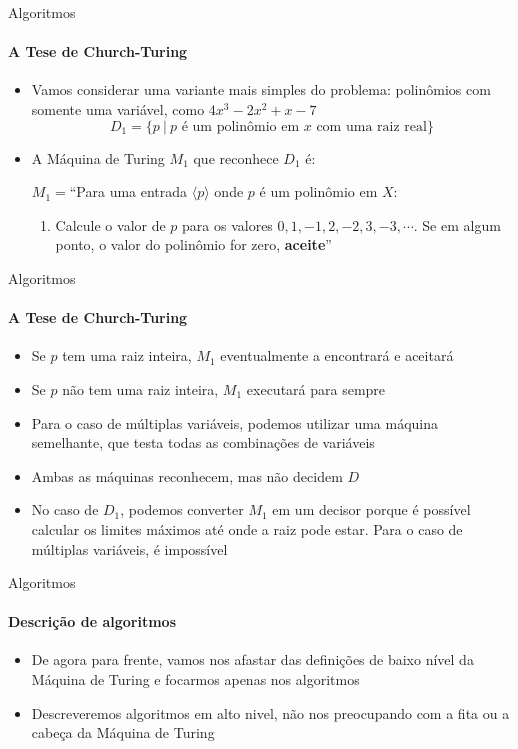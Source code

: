 \documentclass{beamer}
\begin{document}
\begin{frame}{Algoritmos}
	\framesubtitle{A Tese de Church-Turing}
	\begin{itemize}
		\item Vamos considerar uma variante mais simples do problema: polinômios com somente uma variável, como $4x^{3} - 2x^{2} + x - 7$
		\begin{equation*}
			D_{1} = \{p\ |\ p \text{ é um polinômio em }x\text{ com uma raiz real}\}
		\end{equation*}
		\item A Máquina de Turing $M_{1}$ que reconhece $D_{1}$ é:
		
		$M_{1} = $``Para uma entrada $\langle p\rangle$ onde $p$ é um polinômio em $X$:
		\begin{enumerate}
			\item Calcule o valor de $p$ para os valores $0, 1, -1, 2, -2, 3, -3, \cdots$. Se em algum ponto, o valor do polinômio for zero, \textbf{aceite}''
		\end{enumerate}
	\end{itemize}
\end{frame}
\begin{frame}{Algoritmos}
	\framesubtitle{A Tese de Church-Turing}
	\begin{itemize}
		\item Se $p$ tem uma raiz inteira, $M_{1}$ eventualmente a encontrará e aceitará
		\item Se $p$ não tem uma raiz inteira, $M_{1}$ executará para sempre
		\item Para o caso de múltiplas variáveis, podemos utilizar uma máquina semelhante, que testa todas as combinações de variáveis
		\item Ambas as máquinas reconhecem, mas não decidem $D$
		\item No caso de $D_{1}$, podemos converter $M_{1}$ em um decisor porque é possível calcular os limites máximos até onde a raiz pode estar. Para o caso de múltiplas variáveis, é impossível
	\end{itemize}
\end{frame}
\begin{frame}{Algoritmos}
	\framesubtitle{Descrição de algoritmos}
	\begin{itemize}
		\item De agora para frente, vamos nos afastar das definições de baixo nível da Máquina de Turing e focarmos apenas nos algoritmos
		\item Descreveremos algoritmos em alto nivel, não nos preocupando com a fita ou a cabeça da Máquina de Turing
	\end{itemize}
\end{frame}
\end{document}
